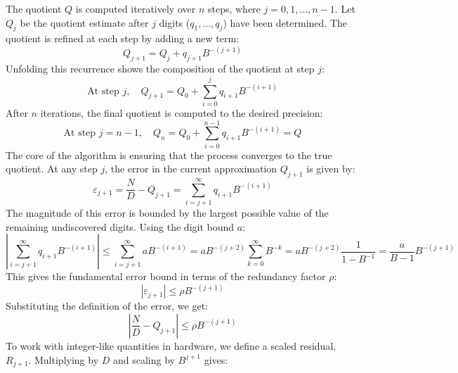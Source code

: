\documentclass{article}
\begin{document}
The quotient $Q$ is computed iteratively over $n$ steps, where $j = 0, 1, \dots, n-1$.
Let $Q_j$ be the quotient estimate after $j$ digits ($q_1, \dots, q_j$) have been determined.
The quotient is refined at each step by adding a new term:
\begin{equation}
  \label{eq:division:quotient_recurrence}
  Q_{j+1} = Q_j + q_{j+1} B^{-(j+1)}
\end{equation}
Unfolding this recurrence shows the composition of the quotient at step $j$:
\begin{equation}
  \label{eq:division:quotient_unfold}
  \text{At step } j, \quad Q_{j+1} = Q_0 + \sum_{i=0}^{j} q_{i+1} B^{-(i+1)}
\end{equation}
After $n$ iterations, the final quotient is computed to the desired precision:
\begin{equation}
  \label{eq:division:quotient_final}
  \text{At step } j = n-1, \quad Q_n = Q_0 + \sum_{i=0}^{n-1} q_{i+1} B^{-(i+1)} = Q
\end{equation}
The core of the algorithm is ensuring that the process converges to the true quotient.
At any step $j$, the error in the current approximation $Q_{j+1}$ is given by:
\begin{equation}
  \label{eq:division:error_def}
  \varepsilon_{j+1} = \frac{N}{D} - Q_{j+1} = \sum_{i=j+1}^{\infty} q_{i+1} B^{-(i+1)}
\end{equation}
The magnitude of this error is bounded by the largest possible value of the remaining undiscovered digits.
Using the digit bound $a$:
\begin{equation}
  \label{eq:division:error_sum}
  \left| \sum_{i=j+1}^{\infty} q_{i+1} B^{-(i+1)} \right| \leq \sum_{i=j+1}^{\infty} a B^{-(i+1)} = a B^{-(j+2)} \sum_{k=0}^{\infty} B^{-k} = a B^{-(j+2)} \frac{1}{1-B^{-1}} = \frac{a}{B-1} B^{-(j+1)}
\end{equation}
This gives the fundamental error bound in terms of the redundancy factor $\rho$:
\begin{equation}
  \label{eq:division:error_bound}
  \left| \varepsilon_{j+1} \right| \leq \rho B^{-(j+1)}
\end{equation}
Substituting the definition of the error, we get:
\begin{equation}
  \label{eq:division:error_bound_sub}
  \left| \frac{N}{D} - Q_{j+1} \right| \leq \rho B^{-(j+1)}
\end{equation}
To work with integer-like quantities in hardware, we define a scaled residual, $R_{j+1}$.
Multiplying by $D$ and scaling by $B^{j+1}$ gives:
\end{document}
